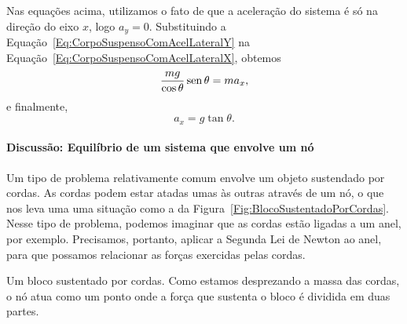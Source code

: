 \noindent{}Nas equações acima, utilizamos o fato de que a aceleração do sistema é só na direção do eixo $x$, logo $a_y = 0$.
Substituindo a Equação~\eqref{Eq:CorpoSuspensoComAcelLateralY} na Equação~\ref{Eq:CorpoSuspensoComAcelLateralX}, obtemos
\begin{equation}
    \frac{mg}{\cos\theta} \operatorname{sen}\theta = ma_x,
\end{equation}
%
e finalmente,
\begin{equation}
    a_x = g \tan\theta.
\end{equation}

\paragraph{Discussão: Equilíbrio de um sistema que envolve um nó}

Um tipo de problema relativamente comum envolve um objeto sustendado por cordas. As cordas podem estar atadas umas às outras através de um nó, o que nos leva uma uma situação como a da Figura~\ref{Fig:BlocoSustentadoPorCordas}. Nesse tipo de problema, podemos imaginar que as cordas estão ligadas a um anel, por exemplo. Precisamos, portanto, aplicar a Segunda Lei de Newton ao anel, para que possamos relacionar as forças exercidas pelas cordas.

\begin{marginfigure}
\centering
{}
\caption{Um bloco sustentado por cordas. Como estamos desprezando a massa das cordas, o nó atua como um ponto onde a força que sustenta o bloco é dividida em duas partes.\label{Fig:BlocoSustentadoPorCordas}}
\end{marginfigure}


